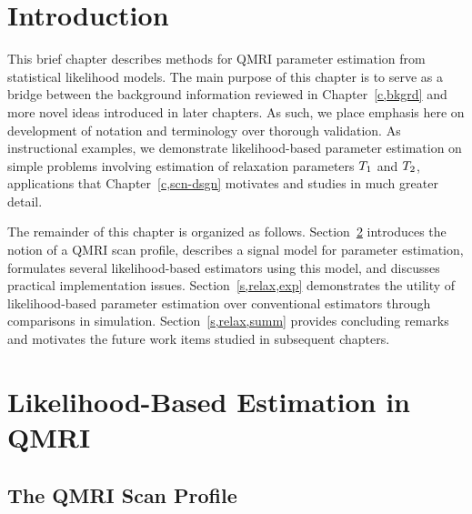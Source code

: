 
\section{Introduction}
\label{s,relax,intro}

This brief chapter describes methods
for QMRI parameter estimation
from statistical likelihood models.
The main purpose of this chapter
is to serve as a bridge 
between the background information
reviewed in Chapter~\ref{c,bkgrd}
and more novel ideas 
introduced in later chapters.
As such, 
we place emphasis here
on development of notation and terminology
over thorough validation.
As instructional examples,
we demonstrate likelihood-based parameter estimation
on simple problems
involving estimation 
of relaxation parameters $T_1$ and $T_2$,
applications
that Chapter~\ref{c,scn-dsgn} motivates and studies 
in much greater detail.

The remainder of this chapter 
is organized as follows.
Section~\ref{s,relax,meth}
introduces the notion of a QMRI scan profile,
describes a signal model for parameter estimation,
formulates several likelihood-based estimators
using this model,
and discusses practical implementation issues.
Section~\ref{s,relax,exp}
demonstrates the utility
of likelihood-based parameter estimation
over conventional estimators
through comparisons in simulation.
Section~\ref{s,relax,summ}
provides concluding remarks
and motivates the future work items
studied in subsequent chapters.

\section{Likelihood-Based Estimation in QMRI}
\label{s,relax,meth}

\subsection{The QMRI Scan Profile}
\label{ss,relax,meth,prof}

